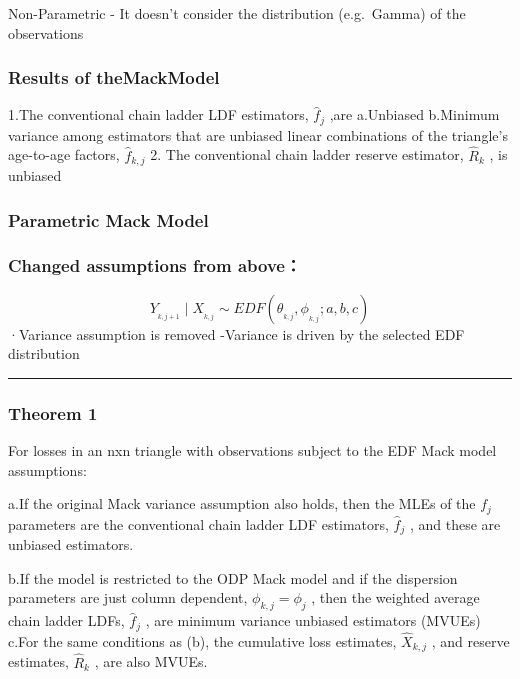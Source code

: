 \documentclass[
]{article}
\begin{document}
Non-Parametric - It doesn't consider the distribution (e.g.~Gamma) of
the observations

\subsubsection{Results of theMackModel}\label{results-of-themackmodel}

1.The conventional chain ladder LDF estimators, \(\hat{f}_{j}\) ,are
a.Unbiased b.Minimum variance among estimators that are unbiased linear
combinations of the triangle's age-to-age factors, \(\hat{f}_{k,j}\) 2.
The conventional chain ladder reserve estimator, \(\hat{R}_{k}\) , is
unbiased

\subsubsection{Parametric Mack Model}\label{parametric-mack-model}

\subsubsection{Changed assumptions from
above：}\label{changed-assumptions-from-above}

\[Y_{_{k,j+1}}\mid X_{_{k,j}}\sim EDF\left(\theta_{_{k,j}},\phi_{_{k,j}};a,b,c\right)\]
·Variance assumption is removed -Variance is driven by the selected EDF
distribution

\begin{center}\rule{0.5\linewidth}{0.5pt}\end{center}

\subsubsection{Theorem 1}\label{theorem-1}

For losses in an nxn triangle with observations subject to the EDF Mack
model assumptions:

a.If the original Mack variance assumption also holds, then the MLEs of
the \(f_{j}\) parameters are the conventional chain ladder LDF
estimators, \(\hat{f}_{j}\) , and these are unbiased estimators.

b.If the model is restricted to the ODP Mack model and if the dispersion
parameters are just column dependent, \(\phi_{k,j}=\phi_{j}\) , then the
weighted average chain ladder LDFs, \(\hat{f}_{j}\) , are minimum
variance unbiased estimators (MVUEs) c.For the same conditions as (b),
the cumulative loss estimates, \(\hat{X}_{k,j}\) , and reserve
estimates, \(\hat{R}_k\) , are also MVUEs.
\end{document}
